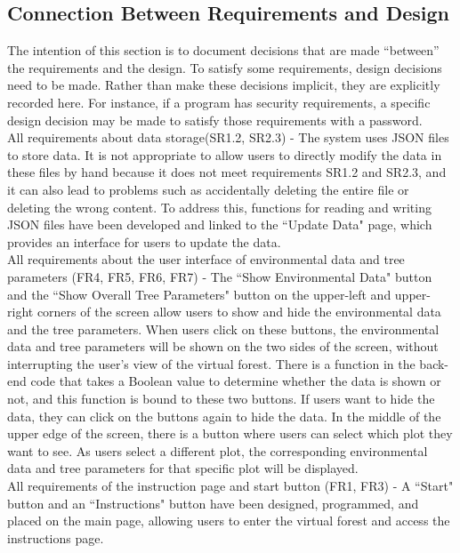 \documentclass[12pt, titlepage]{article}
\begin{document}
\newpage

\subsection{Connection Between Requirements and Design}

\label{SecConnection}

The intention of this section is to document decisions that are made
  ``between'' the requirements and the design.  To satisfy some requirements,
  design decisions need to be made.  Rather than make these decisions implicit,
  they are explicitly recorded here.  For instance, if a program has security
  requirements, a specific design decision may be made to satisfy those
  requirements with a password.\\
  
\noindent All requirements about data storage(SR1.2, SR2.3) - The system uses JSON files to store data. It is not appropriate to allow users to directly modify the data in these files by hand because it does not meet requirements SR1.2 and SR2.3, and it can also lead to problems such as accidentally deleting the entire file or deleting the wrong content. To address this, functions for reading and writing JSON files have been developed and linked to the ``Update Data" page, which provides an interface for users to update the data.\\

\noindent All requirements about the user interface of environmental data and tree parameters (FR4, FR5, FR6, FR7) - The ``Show Environmental Data" button and the ``Show Overall Tree Parameters" button on the upper-left and upper-right corners of the screen allow users to show and hide the environmental data and the tree parameters. When users click on these buttons, the environmental data and tree parameters will be shown on the two sides of the screen, without interrupting the user's view of the virtual forest. There is a function in the back-end code that takes a Boolean value to determine whether the data is shown or not, and this function is bound to these two buttons. If users want to hide the data, they can click on the buttons again to hide the data. In the middle of the upper edge of the screen, there is a button where users can select which plot they want to see. As users select a different plot, the corresponding environmental data and tree parameters for that specific plot will be displayed.\\

\noindent All requirements of the instruction page and start button (FR1, FR3) - A ``Start" button and an ``Instructions" button have been designed, programmed, and placed on the main page, allowing users to enter the virtual forest and access the instructions page.\\
\end{document}
